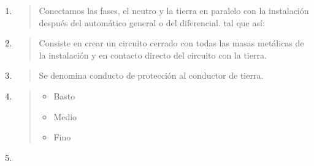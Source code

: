 \documentclass[spanish,openany]{report}
\begin{document}
\begin{enumerate}
\begin{quote}
\begin{paracol}{2}
\begin{itemize}
		\end{itemize}
	  \end{paracol}
  \end{quote}

  \item {}

  \begin{quote}
	  Conectamos las fases, el neutro y la tierra en paralelo con la instalación después del automático general o del diferencial.
	  tal que así:\\

  \end{quote}
  \clearpage

  \item {}

  \begin{quote}
	  Consiste en crear un circuito cerrado con todas las masas metálicas de la instalación y en contacto directo del circuito 
	  con la tierra.
  \end{quote}

  \item {}

  \begin{quote}
	  Se denomina conducto de protección al conductor de tierra.
  \end{quote}

  \item {}

  \begin{quote}
	  \begin{itemize}
		  \item{} Basto
		  \item{} Medio
		  \item{} Fino
	  \end{itemize}
  \end{quote}

  \item {}


\end{enumerate}
\end{document}
